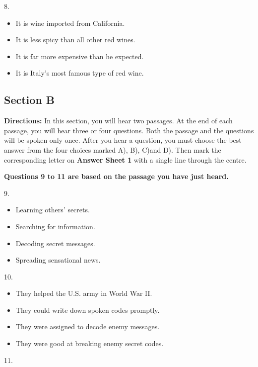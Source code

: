 \documentclass[UTF8,11pt]{ctexart}
\begin{document}
8.


\begin{itemize}[leftmargin=2em,itemsep=.2em,topsep=.4em]\item[A.] It is wine imported from California.
\item[B.] It is less spicy than all other red wines.
\item[C.] It is far more expensive than he expected.
\item[D.] It is Italy’s most famous type of red wine.
\end{itemize}

\subsection*{\textbf{Section B}}


\textbf{Directions:} In this section, you will hear two passages. At the end of each passage, you will hear three or four questions. Both the passage and the questions will be spoken only once. After you hear a question, you must choose the best answer from the four choices marked A), B), C)and D). Then mark the corresponding letter on\textbf{ Answer Sheet 1} with a single line through the centre.


\textbf{Questions 9 to 11 are based on the passage you have just heard.}


9.


\begin{itemize}[leftmargin=2em,itemsep=.2em,topsep=.4em]\item[A.] Learning others’ secrets.
\item[B.] Searching for information.
\item[C.] Decoding secret messages.
\item[D.] Spreading sensational news.
\end{itemize}

10.


\begin{itemize}[leftmargin=2em,itemsep=.2em,topsep=.4em]\item[A.] They helped the U.S. army in World War II.
\item[B.] They could write down spoken codes promptly.
\item[C.] They were assigned to decode enemy messages.
\item[D.] They were good at breaking enemy secret codes.
\end{itemize}

11.
\end{document}
